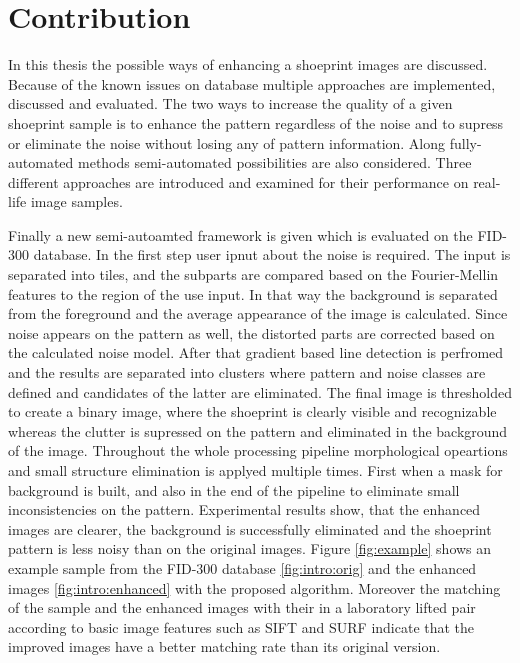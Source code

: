 \documentclass[draft,final]{vutinfth} %
\begin{document}
\section{Contribution}
\par
In this thesis the possible ways of enhancing a shoeprint images are discussed.
Because of the known issues on database multiple approaches are implemented, discussed and evaluated.
The two ways to increase the quality of a given shoeprint sample is to enhance the pattern regardless of the noise and to supress or eliminate the noise without losing any of pattern information.
Along fully-automated methods semi-automated possibilities are also considered.
Three different approaches are introduced and examined for their performance on real-life image samples.
\par
Finally a new semi-autoamted framework is given which is evaluated on the FID-300 database.
In the first step user ipnut about the noise is required.
The input is separated into tiles, and the subparts are compared based on the Fourier-Mellin features to the region of the use input.
In that way the background is separated from the foreground and the average appearance of the image is calculated.
Since noise appears on the pattern as well, the distorted parts are corrected based on the calculated noise model.
After that gradient based line detection is perfromed and the results are separated into clusters where pattern and noise classes are defined and candidates of the latter are eliminated.
The final image is thresholded to create a binary image, where the shoeprint is clearly visible and recognizable whereas the clutter is supressed on the pattern and eliminated in the background of the image.
Throughout the whole processing pipeline morphological opeartions and small structure elimination is applyed multiple times.
First when a mask for background is built, and also in the end of the pipeline to eliminate small inconsistencies on the pattern.
Experimental results show, that the enhanced images are clearer, the background is successfully eliminated and the shoeprint pattern is less noisy than on the original images.
Figure \ref{fig:example} shows an example sample from the FID-300 database \ref{fig:intro:orig} and the enhanced images \ref{fig:intro:enhanced} with the proposed algorithm.
Moreover the  matching of the sample and the enhanced images with their in a laboratory lifted pair according to basic image features such as SIFT and SURF indicate that the improved images have a better matching rate than its original version.
\end{document}
